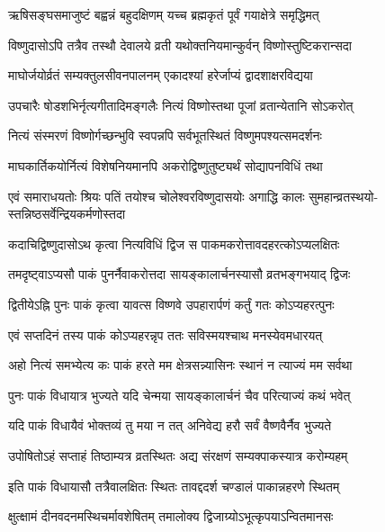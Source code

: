 \twolineshloka
{ऋषिसङ्घसमाजुष्टं बह्वन्नं बहुदक्षिणम्}
{यच्च ब्रह्मकृतं पूर्वं गयाक्षेत्रे समृद्धिमत्} %

\twolineshloka
{विष्णुदासोऽपि तत्रैव तस्थौ देवालये व्रती}
{यथोक्तनियमान्कुर्वन् विष्णोस्तुष्टिकरान्सदा} %

\twolineshloka
{माघोर्जयोर्व्रतं सम्यक्तुलसीवनपालनम्}
{एकादश्यां हरेर्जाप्यं द्वादशाक्षरविद्यया} %

\twolineshloka
{उपचारैः षोडशभिर्नृत्यगीतादिमङ्गलैः}
{नित्यं विष्णोस्तथा पूजां व्रतान्येतानि सोऽकरोत्} %

\twolineshloka
{नित्यं संस्मरणं विष्णोर्गच्छन्भुवि स्वपन्नपि}
{सर्वभूतस्थितं विष्णुमपश्यत्समदर्शनः} %

\twolineshloka
{माघकार्तिकयोर्नित्यं विशेषनियमानपि}
{अकरोद्विष्णुतुष्ट्यर्थं सोद्यापनविधिं तथा} %

\fourlineindentedshloka
{एवं समाराधयतोः श्रियः पतिं}
{तयोश्च चोलेश्वरविष्णुदासयोः}
{अगाद्धि कालः सुमहान्व्रतस्थयो-}
{स्तन्निष्ठसर्वेन्द्रियकर्मणोस्तदा} %





\twolineshloka
{कदाचिद्विष्णुदासोऽथ कृत्वा नित्यविधिं द्विज}
{स पाकमकरोत्तावदहरत्कोऽप्यलक्षितः} %

\twolineshloka
{तमदृष्ट्वाऽप्यसौ पाकं पुनर्नैवाकरोत्तदा}
{सायङ्कालार्चनस्यासौ व्रतभङ्गभयाद् द्विजः} %

\twolineshloka
{द्वितीयेऽह्नि पुनः पाकं कृत्वा यावत्स विष्णवे}
{उपहारार्पणं कर्तुं गतः कोऽप्यहरत्पुनः} %

\twolineshloka
{एवं सप्तदिनं तस्य पाकं कोऽप्यहरन्नृप}
{ततः सविस्मयश्चाथ मनस्येवमधारयत्} %

\twolineshloka
{अहो नित्यं समभ्येत्य कः पाकं हरते मम}
{क्षेत्रसन्न्यासिनः स्थानं न त्याज्यं मम सर्वथा} %

\twolineshloka
{पुनः पाकं विधायात्र भुज्यते यदि चेन्मया}
{सायङ्कालार्चनं चैव परित्याज्यं कथं भवेत्} %

\twolineshloka
{यदि पाकं विधायैवं भोक्तव्यं तु मया न तत्}
{अनिवेद्य हरौ सर्वं वैष्णवैर्नैव भुज्यते} %

\twolineshloka
{उपोषितोऽहं सप्ताहं तिष्ठाम्यत्र व्रतस्थितः}
{अद्य संरक्षणं सम्यक्पाकस्यात्र करोम्यहम्} %

\twolineshloka
{इति पाकं विधायासौ तत्रैवालक्षितः स्थितः}
{तावद्ददर्श चण्डालं पाकान्नहरणे स्थितम्} %

\twolineshloka
{क्षुत्क्षामं दीनवदनमस्थिचर्मावशेषितम्}
{तमालोक्य द्विजाग्र्योऽभूत्कृपयाऽन्वितमानसः} %

